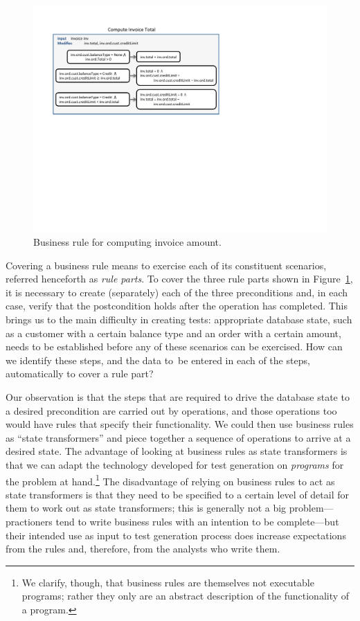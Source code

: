 \begin{figure}
\centering
\includegraphics[trim=55 320 286 54,clip,width=\columnwidth]{figs/invoice}
\vspace*{-18pt}
\caption{Business rule for computing invoice amount.}
\label{fig:invoice}
\end{figure}

Covering a business rule means to exercise each of its constituent scenarios,
referred henceforth as \textit{rule parts}.  To cover the three rule parts shown
in Figure~\ref{fig:invoice}, it is necessary to create (separately) each of the
three preconditions and, in each case, verify that the postcondition holds after
the operation has completed.  This brings us to the main difficulty in creating
tests: appropriate database state, such as a customer with a certain balance
type and an order with a certain amount, needs to be established before any of
these scenarios can be exercised.
How can we identify these steps, and the data to~be entered in
each of the steps, automatically to cover a rule part?

Our observation is that the steps that are required to drive the database state
to a desired precondition are carried out by operations, and those operations
too would have rules that specify their functionality.  We could then use
business rules as ``state transformers'' and piece together a sequence of
operations to arrive at a desired state.  The advantage of looking at business
rules as state transformers is that we can adapt the technology developed for
test generation on \textit{programs} for the problem at hand.\footnote{We
  clarify, though, that business rules are themselves not executable programs;
  rather they only are an abstract description of the functionality of a
  program.}  The disadvantage of relying on business rules to act as state
transformers is that they need to be specified to a certain level of detail for
them to work out as state transformers; this is generally not a big
problem---practioners tend to write business rules with an intention to be
complete---but their intended use as input to test generation process does
increase expectations from the rules and, therefore, from the analysts who write
them.


